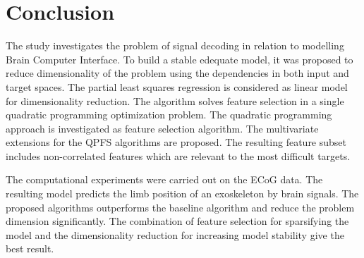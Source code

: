 \documentclass[12pt,twoside]{article}
\theoremstyle{definition}
\begin{document}
\section{Conclusion}
The study investigates the problem of signal decoding in relation to modelling Brain Computer Interface. 
To build a stable edequate model, it was proposed to reduce dimensionality of the problem using the dependencies in both input and target spaces.
The partial least squares regression is considered as linear model for dimensionality reduction.
The algorithm solves feature selection in a single quadratic programming optimization problem.
The quadratic programming approach is investigated as feature selection algorithm.
The multivariate extensions for the QPFS algorithms are proposed.
The resulting feature subset includes non-correlated features which are relevant to the most difficult targets.

The computational experiments were carried out on the ECoG data. 
The resulting model predicts the limb position of an exoskeleton by brain signals.
The proposed algorithms outperforms the baseline algorithm and reduce the problem dimension significantly.
The combination of feature selection for sparsifying the model and the dimensionality reduction for increasing model stability give the best result.



\end{document}

